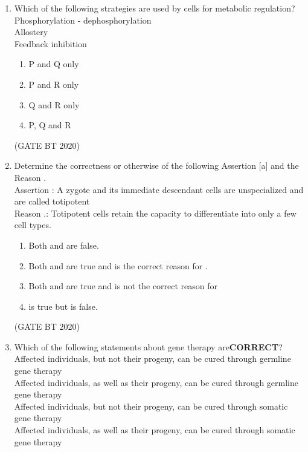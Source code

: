 \documentclass[journal,12pt,onecolumn]{IEEEtran}
\theoremstyle{remark}
\begin{document}
\begin{enumerate}[label=Q\arabic*:, start=26, leftmargin=2em]
\item Which of the following strategies are used by cells for metabolic regulation?\\
Phosphorylation - dephosphorylation\\
 Allostery\\
 Feedback inhibition\\
\begin{multicols}{2}
\begin{enumerate}[label=\alph*)]

\item P and Q only
\item P and R only
\item Q and R only
\item P, Q and R 

\end{enumerate}
\end{multicols}
\hfill(GATE BT 2020)

\item Determine the correctness or otherwise of the following Assertion [a] and the Reason .\\
Assertion : A zygote and its immediate descendant cells are unspecialized and are called totipotent\\
Reason .: Totipotent cells retain the capacity to differentiate into only a few cell types.

\begin{enumerate}[label=\alph*)]

\item\; Both  and  are false.
\item\; Both and  are true and is the correct reason for .
\item\; Both  and  are true and is not the correct reason for 
\item\;  is true but is  false.

\end{enumerate} 

\hfill(GATE BT 2020)

\item Which of the following statements about gene therapy are\textbf{CORRECT}?\\
Affected individuals, but not their progeny, can be cured through germline gene therapy\\
Affected individuals, as well as their progeny, can be cured through germline gene therapy\\
Affected individuals, but not their progeny, can be cured through somatic gene therapy\\Affected individuals, as well as their progeny, can be cured through somatic gene therapy


\end{enumerate}
\end{document}
